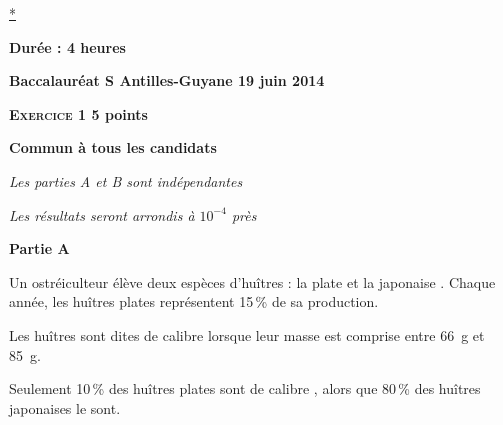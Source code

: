 \documentclass[10pt]{article}
\begin{document}
\hyperlink{Index}{*}
\newpage
\hypertarget{Antilles}{}

\renewcommand \footrulewidth{.2pt}
\pagestyle{fancy}
\thispagestyle{empty}
\begin{center}\textbf{Durée : 4 heures}

\vspace{0,5cm}


{\Large \textbf{Baccalauréat S Antilles-Guyane 19 juin 2014}}
\end{center}

\vspace{0,5cm}

\textbf{\textsc{Exercice 1} \hfill 5 points}
 
\textbf{Commun à tous les candidats}

\medskip

\emph{Les parties A et B sont indépendantes}

\medskip
 
\emph{Les résultats seront arrondis à $10^{-4}$ près}

\medskip
 
\textbf{Partie A}

\medskip
 
Un ostréiculteur élève deux espèces d'huîtres : \og la plate \fg{} et \og la japonaise \fg. Chaque année, les huîtres plates représentent 15\,\% de sa production.
 
Les huîtres sont dites de calibre  lorsque leur masse est comprise entre 66~g et 85~g.
 
Seulement 10\,\% des huîtres plates sont de calibre , alors que 80\,\% des huîtres japonaises le sont.

\medskip
 
\end{document}
